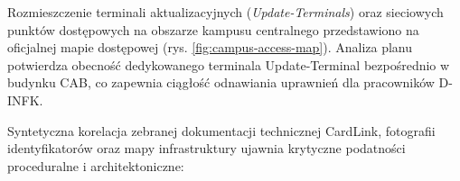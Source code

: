 Rozmieszczenie terminali aktualizacyjnych (\textit{Update-Terminals}) oraz sieciowych punktów dostępowych na obszarze kampusu centralnego przedstawiono na oficjalnej mapie dostępowej (rys. \ref{fig:campus-access-map}). Analiza planu potwierdza obecność dedykowanego terminala Update-Terminal bezpośrednio w budynku CAB, co zapewnia ciągłość odnawiania uprawnień dla pracowników D-INFK.



Syntetyczna korelacja zebranej dokumentacji technicznej CardLink, fotografii identyfikatorów oraz mapy infrastruktury ujawnia krytyczne podatności proceduralne i architektoniczne:

